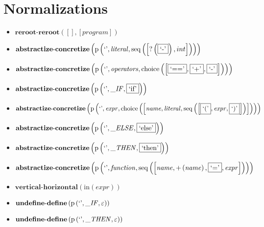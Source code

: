 \section{Normalizations}
{\footnotesize\begin{itemize}
\item $\mathbf{reroot\text{-}reroot}\left([],[\mathit{program}]\right)$
\item $\mathbf{abstractize\text{-}concretize}\\\left(\mathrm{p}\left(\text{`'},\mathit{literal},\mathrm{seq}\left(\left[{?}\left(\fbox{$\text{`-'}$}\right), int\right]\right)\right)\right)$
\item $\mathbf{abstractize\text{-}concretize}\\\left(\mathrm{p}\left(\text{`'},\mathit{operators},\mathrm{choice}\left(\left[\fbox{$\text{`=='}$}, \fbox{$\text{`+'}$}, \fbox{$\text{`-'}$}\right]\right)\right)\right)$
\item $\mathbf{abstractize\text{-}concretize}\\\left(\mathrm{p}\left(\text{`'},\mathit{\_ IF},\fbox{$\text{`if'}$}\right)\right)$
\item $\mathbf{abstractize\text{-}concretize}\\\left(\mathrm{p}\left(\text{`'},\mathit{expr},\mathrm{choice}\left(\left[\mathit{name}, \mathit{literal}, \mathrm{seq}\left(\left[\fbox{$\text{`('}$}, \mathit{expr}, \fbox{$\text{`)'}$}\right]\right)\right]\right)\right)\right)$
\item $\mathbf{abstractize\text{-}concretize}\\\left(\mathrm{p}\left(\text{`'},\mathit{\_ ELSE},\fbox{$\text{`else'}$}\right)\right)$
\item $\mathbf{abstractize\text{-}concretize}\\\left(\mathrm{p}\left(\text{`'},\mathit{\_ THEN},\fbox{$\text{`then'}$}\right)\right)$
\item $\mathbf{abstractize\text{-}concretize}\\\left(\mathrm{p}\left(\text{`'},\mathit{function},\mathrm{seq}\left(\left[\mathit{name}, {+}\left(\mathit{name}\right), \fbox{$\text{`='}$}, \mathit{expr}\right]\right)\right)\right)$
\item $\mathbf{vertical\text{-}horizontal}\left(\mathrm{in}(expr)\right)$
\item $\mathbf{undefine\text{-}define}\\\left(\mathrm{p}\left(\text{`'},\mathit{\_ IF},\varepsilon\right)\right)$
\item $\mathbf{undefine\text{-}define}\\\left(\mathrm{p}\left(\text{`'},\mathit{\_ THEN},\varepsilon\right)\right)$

\end{itemize}}
